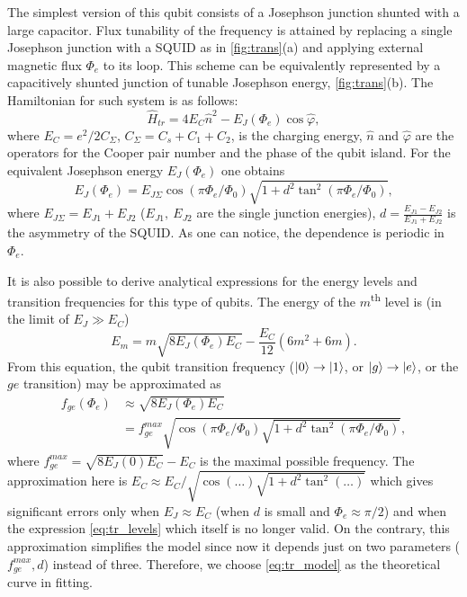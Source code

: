 \documentclass[%
 aip,
 draft,
 amsmath,amssymb,
 reprint,%
]{revtex4-1}
\begin{document}
The simplest version of this qubit consists of a Josephson junction shunted with a large capacitor. Flux tunability of the frequency is attained by replacing a single Josephson junction with a SQUID as in \autoref{fig:trans}(a) and applying external magnetic flux $\Phi_e$ to its loop. This scheme can be equivalently represented by a capacitively shunted junction of tunable Josephson energy, \autoref{fig:trans}(b). The Hamiltonian for such system is as follows: 
\begin{equation}
\hat{H}_{tr} = 4E_C \hat n^2 - E_J(\Phi_e) \cos \hat\varphi,
\label{eq:tr_ham}
\end{equation}
where $E_C = e^2/2C_{\Sigma}$, $C_{\Sigma} = C_s + C_1 +C_2$, is the charging energy, $\hat n$ and $\hat \varphi$ are the operators for the Cooper pair number and the phase of the qubit island. For the equivalent Josephson energy $E_{J}(\Phi_e)$ one obtains
\begin{equation}
E_{J}(\Phi_e) = E_{J\Sigma}\cos\left(\pi \Phi_e/\Phi_0\right) \sqrt{1+d^2 \tan^2 \left(\pi \Phi_e/\Phi_0\right)},
\label{eq:EJ_Phie}
\end{equation}  
where $E_{J\Sigma} = E_{J1}+E_{J2}$ ($E_{J1},\ E_{J2}$ are the single junction energies), $d = \frac{E_{J1}-E_{J2}}{E_{J1}+E_{J2}}$ is the asymmetry of the SQUID. As one can notice, the dependence is periodic in $\Phi_e$.

It is also possible to derive analytical expressions for the energy levels and transition frequencies for this type of qubits. The energy of the $m$\textsuperscript{th} level is (in the limit of $E_J\gg E_C$) \cite{koch2007}
\begin{equation}
E_m = m \sqrt{8E_J(\Phi_e) E_C} -\frac{E_C}{12}(6m^2+6m).
\label{eq:tr_levels}
\end{equation}
From this equation, the qubit transition frequency ($ \ket{0}\rightarrow \ket{1}$, or $ \ket{g}\rightarrow \ket{e}$, or the $ge$ transition) may be approximated as 
\begin{equation}
\begin{aligned}
f_{ge}(\Phi_e) &\approx \sqrt{8 E_J (\Phi_e) E_C} \\
&= f_{ge}^{max} \sqrt{\cos\left(\pi \Phi_e/\Phi_0\right) \sqrt{1+d^2 \tan^2 \left(\pi \Phi_e/\Phi_0\right)}},
\end{aligned}
\label{eq:tr_model}
\end{equation}
where $f_{ge}^{max} = \sqrt{8 E_J(0) E_C}-E_C$ is the maximal possible frequency. The approximation here is $E_C \approx E_C/\sqrt{\cos\left(\dots\right) \sqrt{1+d^2 \tan^2 \left(\dots\right)}}$  which gives significant errors only when $E_J\approx E_C$ (when $d$ is small and $\Phi_e\approx\pi/2$) and when the expression \eqref{eq:tr_levels} which itself is no longer valid. On the contrary, this approximation simplifies the model since now it depends just on two parameters ($f_{ge}^{max}, d$) instead of three. Therefore, we choose \eqref{eq:tr_model} as the theoretical curve in fitting.
\end{document}
